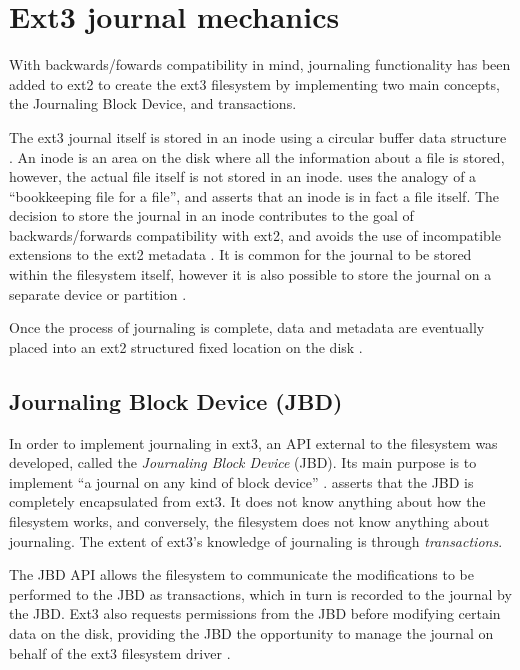 \section{Ext3 journal mechanics}

With backwards/fowards compatibility in mind, journaling functionality has been added to ext2 to create the ext3 filesystem by implementing two main concepts, the Journaling Block Device, and transactions.

The ext3 journal itself is stored in an inode using a circular buffer data structure \citep{Robbins2001a, Tweedie2000, Jones2008, Prabhakaran2005a}. An inode is an area on the disk where all the information about a file is stored, however, the actual file itself is not stored in an inode. \citet[p. 2]{Best2002} uses the analogy of a ``bookkeeping file for a file'', and asserts that an inode is in fact a file itself. The decision to store the journal in an inode contributes to the goal of backwards/forwards compatibility with ext2, and avoids the use of incompatible extensions to the ext2 metadata \citep{Robbins2001a}. It is common for the journal to be stored within the filesystem itself, however it is also possible to store the journal on a separate device or partition \citep{Prabhakaran2005a, Tweedie2000}.

Once the process of journaling is complete, data and metadata are eventually placed into an ext2 structured fixed location on the disk \citep{Prabhakaran2005a}.

\subsection{Journaling Block Device (JBD)}

In order to implement journaling in ext3, an API external to the filesystem was developed, called the \emph{Journaling Block Device} (JBD). Its main purpose is to implement ``a journal on any kind of block device'' \citep[p. 8]{Robbins2001a}. \citet{Tweedie2000} asserts that the JBD is completely encapsulated from ext3. It does not know anything about how the filesystem works, and conversely, the filesystem does not know anything about journaling. The extent of ext3's knowledge of journaling is through \emph{transactions}.

The JBD API allows the filesystem to communicate the modifications to be performed to the JBD as transactions, which in turn is recorded to the journal by the JBD. Ext3 also requests permissions from the JBD before modifying certain data on the disk, providing the JBD the opportunity to manage the journal on behalf of the ext3 filesystem driver \citep{Robbins2001a}.


